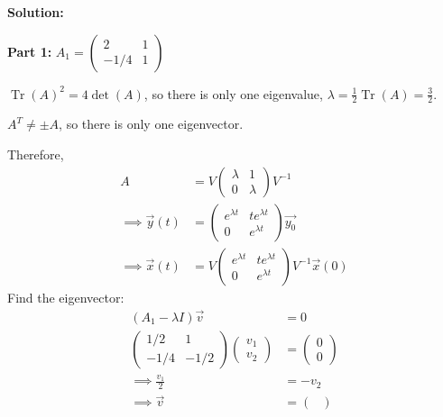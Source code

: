 \documentclass[12pt]{article}
\DeclareMathOperator{\Tr}{Tr}
\newenvironment{solution}{
    \textbf{Solution:}
    
}{
    
    \vspace{2em}
}
\begin{document}
\begin{solution}
    \textbf{Part 1:} \(A_1 =\begin{pmatrix}
        2 & 1 \\
        -1/4 & 1
    \end{pmatrix}\)

    \(\Tr(A)^2 = 4\det(A)\), so there is only one eigenvalue, \(\lambda = \frac{1}{2}\Tr(A) = \frac{3}{2}\).

    \(A^T \neq \pm A\), so there is only one eigenvector.

    Therefore,
    \[
        \begin{aligned}
            A &= V \begin{pmatrix}
                \lambda & 1 \\
                0 & \lambda
            \end{pmatrix} V^{-1}\\
            \implies \vec{y}(t) &= \begin{pmatrix}
                e^{\lambda t} &te^{\lambda t}\\
                0 & e^{\lambda t}
            \end{pmatrix}\vec{y_0}\\
            \implies \vec{x}(t) &= V \begin{pmatrix}
                e^{\lambda t} & te^{\lambda t} \\
                0 & e^{\lambda t}
            \end{pmatrix} V^{-1} \vec{x}(0)
        \end{aligned}
    \]
    Find the eigenvector:
    \[
        \begin{aligned}
            (A_1 - \lambda I)\vec{v} &= 0\\
            \begin{pmatrix}
                1/2 & 1 \\
                -1/4 & -1/2
            \end{pmatrix} \begin{pmatrix}
                v_1 \\
                v_2
            \end{pmatrix} &= \begin{pmatrix}
                0 \\
                0
            \end{pmatrix}\\
            \implies \frac{v_1}{2} &= -v_2\\
            \implies \vec{v} &= \begin{pmatrix}

\end{pmatrix}
\end{aligned}\]
\end{solution}
\end{document}
